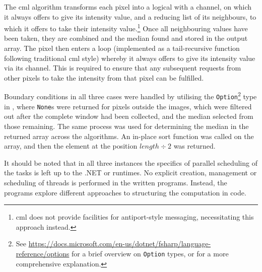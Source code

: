 
The \gls{cml} algorithm transforms each pixel into a logical  with a channel, on which it always offers to give its intensity value, and a reducing list of its neighbours, to which it offers to take their intensity value.\footnote{\Gls{cml} does not provide facilities for antiport-style messaging, necessitating this approach instead.}  Once all neighbouring values have been taken, they are combined and the median found and stored in the output array.  The pixel then enters a loop (implemented as a tail-recursive function following traditional \gls{cml} style) whereby it always offers to give its intensity value via its channel.  This is required to ensure that any subsequent requests from other pixels to take the intensity from that pixel can be fulfilled.

Boundary conditions in all three cases were handled by utilising the \texttt{Option}\footnote{See \url{https://docs.microsoft.com/en-us/dotnet/fsharp/language-reference/options} for a brief overview on \texttt{Option} types, or \eg{} \cite{Syme2015a} for a more comprehensive explanation.} type in \fsharp{}, where \texttt{None}s were returned for pixels outside the images, which were filtered out after the complete window had been collected, and the median selected from those remaining.  The same process was used for determining the median in the returned array across the algorithms.  An in-place sort function was called on the array, and then the element at the position \(\mathit{length} \div 2\) was returned.

It should be noted that in all three instances the specifics of parallel scheduling of the tasks is left up to the .NET or \hopac{} runtimes.  No explicit creation, management or scheduling of threads is performed in the written programs.  Instead, the programs explore different approaches to structuring the computation in code.

